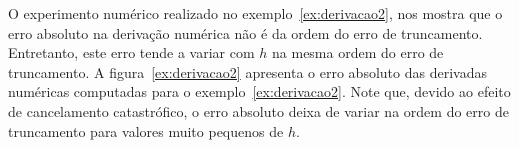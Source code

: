 \begin{obs}
  O experimento numérico realizado no exemplo~\ref{ex:derivacao2}, nos mostra que o erro absoluto na derivação numérica não é da ordem do erro de truncamento. Entretanto, este erro tende a variar com $h$ na mesma ordem do erro de truncamento. A figura~\ref{ex:derivacao2} apresenta o erro absoluto das derivadas numéricas computadas para o exemplo~\ref{ex:derivacao2}. Note que, devido ao efeito de cancelamento catastrófico, o erro absoluto deixa de variar na ordem do erro de truncamento para valores muito pequenos de $h$.
\end{obs}



